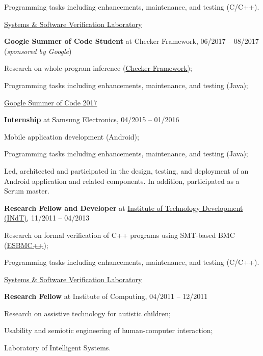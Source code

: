 \documentclass[letterpaper]{article}
\renewenvironment{itemize}{
  \begin{list}{}{
    \setlength{\leftmargin}{1.5em}
  }
}{
  \end{list}
}
\begin{document}
\begin{enumerate}
\begin{itemize}
        \item{\textendash} {Programming tasks including enhancements, maintenance, and testing (C/C++).}
        \item{\textendash} \href{https://ssvlab.github.io}{Systems \& Software Verification Laboratory}
      \end{itemize}
      \item{{\bf Google Summer of Code Student} at Checker Framework, 06/2017 -- 08/2017 ({\it sponsored by Google})} 
      \begin{itemize}
        \item{\textendash} {Research on whole-program inference (\href{https://checkerframework.org/}{Checker Framework});}
        \item{\textendash} {Programming tasks including enhancements, maintenance, and testing (Java);}
        \item{\textendash} \href{https://summerofcode.withgoogle.com/archive/2017/projects/6689181245898752/}{Google Summer of Code 2017}
      \end{itemize}
      \item{{\bf Internship} at Samsung Electronics, 04/2015 -- 01/2016}
      \begin{itemize}
        \item{\textendash} {Mobile application development (Android);}
        \item{\textendash} {Programming tasks including enhancements, maintenance, and testing (Java);}
        \item{\textendash} {Led, architected and participated in the design, testing, and deployment of an Android application and related components. In addition, participated as a Scrum master.}
      \end{itemize}
      \item{{\bf Research Fellow and Developer} at \href{http://www.indt.org.br}{Institute of Technology Development (INdT)}, 11/2011 -- 04/2013}
            \begin{itemize}
        \item{\textendash} {Research on formal verification of C++ programs using SMT-based BMC (\href{http://www.esbmc/}{ESBMC++});}
        \item{\textendash} {Programming tasks including enhancements, maintenance, and testing (C/C++).}
        \item{\textendash} \href{https://ssvlab.github.io}{Systems \& Software Verification Laboratory}
      \end{itemize}
      \item{{\bf Research Fellow} at Institute of Computing, 04/2011 -- 12/2011}
            \begin{itemize}
        \item{\textendash} {Research on assistive technology for autistic children;}
        \item{\textendash} {Usability and semiotic engineering of human-computer interaction;}
        \item{\textendash} {Laboratory of Intelligent Systems.}
      \end{itemize}
    \end{enumerate}
    
\end{document}
